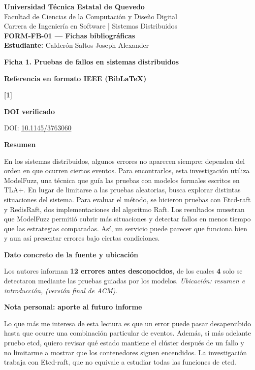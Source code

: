 \documentclass[11pt,letterpaper]{article}
\newcommand{\ficha}[2]{\begin{center}\large\bfseries Ficha #1. #2\end{center}\vspace{0.4em}}
\newcommand{\campo}[1]{\par\vspace{0.45em}\noindent\textbf{#1}\par}
\begin{document}
\begin{center}
{\large\bfseries Universidad Técnica Estatal de Quevedo}\\[3pt]
Facultad de Ciencias de la Computación y Diseño Digital\\
Carrera de Ingeniería en Software \quad | \quad Sistemas Distribuidos\\[4pt]
\textbf{FORM-FB-01 --- Fichas bibliográficas}\\
\textbf{Estudiante:} Calderón Saltos Joseph Alexander
\end{center}
\vspace{0.6em}

\ficha{1}{Pruebas de fallos en sistemas distribuidos}
\campo{Referencia en formato IEEE (BibLaTeX)}
\textbf{[1]}\enspace {}
\campo{DOI verificado}
DOI: \href{https://doi.org/10.1145/3763060}{10.1145/3763060}
\campo{Resumen}
En los sistemas distribuidos, algunos errores no aparecen siempre: dependen del orden en que ocurren ciertos eventos. Para encontrarlos, esta investigación utiliza ModelFuzz, una técnica que guía las pruebas con modelos formales escritos en TLA+. En lugar de limitarse a las pruebas aleatorias, busca explorar distintas situaciones del sistema. Para evaluar el método, se hicieron pruebas con Etcd-raft y RedisRaft, dos implementaciones del algoritmo Raft. Los resultados muestran que ModelFuzz permitió cubrir más situaciones y detectar fallos en menos tiempo que las estrategias comparadas. Así, un servicio puede parecer que funciona bien y aun así presentar errores bajo ciertas condiciones.
\campo{Dato concreto de la fuente y ubicación}
Los autores informan \textbf{12 errores antes desconocidos}, de los cuales \textbf{4} solo se detectaron mediante las pruebas guiadas por los modelos. \textit{Ubicación: resumen e introducción, \cite[pp.~1--2]{gulcan2025fuzzing} (versión final de ACM).}
\campo{Nota personal: aporte al futuro informe}
Lo que más me interesa de esta lectura es que un error puede pasar desapercibido hasta que ocurre una combinación particular de eventos. Además, si más adelante pruebo etcd, quiero revisar qué estado mantiene el clúster después de un fallo y no limitarme a mostrar que los contenedores siguen encendidos. La investigación trabaja con Etcd-raft, que no equivale a estudiar todas las funciones de etcd.
\end{document}
